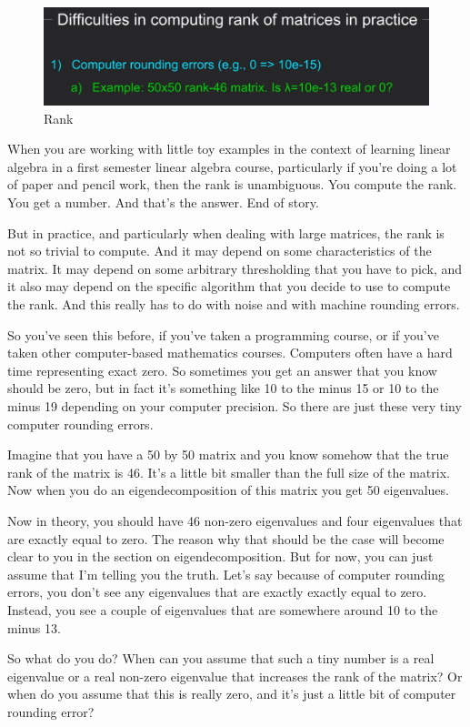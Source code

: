 \documentclass[fleqn,10pt]{olplainarticle}
\theoremstyle{definition}
\theoremstyle{remark}
\begin{document}
\begin{figure}[ht]
	\centering
	\includegraphics[width=0.4\linewidth]{images/rank-16.png}
	\caption{Rank}
	\label{fig:rank_16}
\end{figure}

When you are working with little toy examples in the context of learning linear algebra in a first semester linear algebra course, particularly if you're doing a lot of paper and pencil work, then the rank is unambiguous. You compute the rank. You get a number. And that's the answer. End of story.

But in practice, and particularly when dealing with large matrices, the rank is not so trivial to compute. And it may depend on some characteristics of the matrix. It may depend on some arbitrary thresholding that you have to pick, and it also may depend on the specific algorithm that you decide to use to compute the rank. And this really has to do with noise and with machine rounding errors.

So you've seen this before, if you've taken a programming course, or if you've taken other computer-based mathematics courses. Computers often have a hard time representing exact zero. So sometimes you get an answer that you know should be zero, but in fact it's something like 10 to the minus 15 or 10 to the minus 19 depending on your computer precision. So there are just these very tiny computer rounding errors.

Imagine that you have a 50 by 50 matrix and you know somehow that the true rank of the matrix is 46. It's a little bit smaller than the full size of the matrix. Now when you do an eigendecomposition of this matrix you get 50 eigenvalues.

Now in theory, you should have 46 non-zero eigenvalues and four eigenvalues that are exactly equal to zero. The reason why that should be the case will become clear to you in the section on eigendecomposition. But for now, you can just assume that I'm telling you the truth. Let's say because of computer rounding errors, you don't see any eigenvalues that are exactly exactly equal to zero. Instead, you see a couple of eigenvalues that are somewhere around 10 to the minus 13.

So what do you do? When can you assume that such a tiny number is a real eigenvalue or a real non-zero eigenvalue that increases the rank of the matrix? Or when do you assume that this is really zero, and it's just a little bit of computer rounding error?
\end{document}
